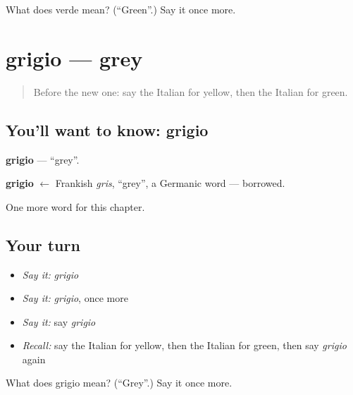 \begin{tcolorbox}[breakable,colback=teal!4,colframe=teal!35!black,title={Before you move on}]
What does verde mean? (\textquotedblleft{}Green\textquotedblright{}.) Say it once more.
\end{tcolorbox}
\section[grigio]{grigio — grey}

\label{lesson:IT-C77-grigio}



\begin{quote}
Before the new one: say the Italian for yellow, then the Italian for green.
\end{quote}

\subsection*{You'll want to know: grigio}
\textbf{grigio} — \textquotedblleft{}grey\textquotedblright{}.

\begin{cousinweb}
\textbf{grigio} $\leftarrow$ Frankish \emph{gris}, \textquotedblleft{}grey\textquotedblright{}, a Germanic word — borrowed.
\end{cousinweb}

\begin{grammarlens}[title={What you've built}]
One more word for this chapter.
\end{grammarlens}

\subsection*{Your turn}
\begin{itemize}
\raggedright
  \item \emph{Say it:} \emph{grigio}
  \item \emph{Say it:} \emph{grigio}, once more
  \item \emph{Say it:} say \emph{grigio}
  \item \emph{Recall:} say the Italian for yellow, then the Italian for green, then say \emph{grigio} again
\end{itemize}

\begin{tcolorbox}[breakable,colback=teal!4,colframe=teal!35!black,title={Before you move on}]
What does grigio mean? (\textquotedblleft{}Grey\textquotedblright{}.) Say it once more.
\end{tcolorbox}
